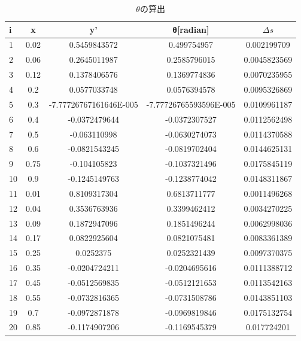 \documentclass[a4j,twoside,openright,11pt]{jarticle}
\begin{document}
\begin{table}[htb]
\begin{center}
  \caption{$\theta$の算出}
  \begin{tabular}{|l||c|c|c|c|} \hline
i&x&y'&θ[radian]&$\Delta s$\\\hline
1&0.02&0.5459843572&0.499754957&0.002199709\\
2&0.06&0.2645011987&0.2585796015&0.0045823569\\
3&0.12&0.1378406576&0.1369774836&0.0070235955\\
4&0.2&0.0577033748&0.0576394578&0.0095326869\\
5&0.3&-7.77726767161646E-005&-7.77726765593596E-005&0.0109961187\\
6&0.4&-0.0372479644&-0.0372307527&0.0112562498\\
7&0.5&-0.063110998&-0.0630274073&0.0114370588\\
8&0.6&-0.0821543245&-0.0819702404&0.0144625131\\
9&0.75&-0.104105823&-0.1037321496&0.0175845119\\
10&0.9&-0.1245149763&-0.1238774042&0.0148311867\\
11&0.01&0.8109317304&0.6813711777&0.0011496268\\
12&0.04&0.3536763936&0.3399462412&0.0034270225\\
13&0.09&0.1872947096&0.1851496244&0.0062998036\\
14&0.17&0.0822925604&0.0821075481&0.0083361389\\
15&0.25&0.0252375&0.0252321439&0.0097370375\\
16&0.35&-0.0204724211&-0.0204695616&0.0111388712\\
17&0.45&-0.0512569835&-0.0512121653&0.0113542163\\
18&0.55&-0.0732816365&-0.0731508786&0.0143851103\\
19&0.7&-0.0972871878&-0.0969819846&0.0175132754\\
20&0.85&-0.1174907206&-0.1169545379&0.017724201\\
\hline
  \end{tabular}
\end{center}
\end{table}
\end{document}
